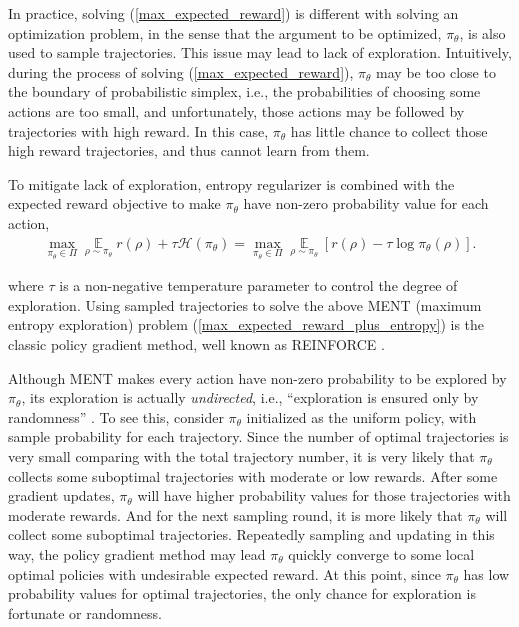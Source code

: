 \documentclass{article}
\DeclareMathOperator*\ep{\mathbb{E}}
\begin{document}
In practice, solving (\ref{max_expected_reward}) is different with solving an optimization problem, in the sense that the argument to be optimized, $\pi_\theta$, is also used to sample trajectories. This issue may lead to lack of exploration. Intuitively, during the process of solving (\ref{max_expected_reward}), $\pi_\theta$ may be too close to the boundary of probabilistic simplex, i.e., the probabilities of choosing some actions are too small, and unfortunately, those actions may be followed by trajectories with high reward. In this case, $\pi_\theta$ has little chance to collect those high reward trajectories, and thus cannot learn from them.

To mitigate lack of exploration, entropy regularizer is combined with the expected reward objective to make $\pi_\theta$ have non-zero probability value for each action,
\begin{equation}
\label{max_expected_reward_plus_entropy}
\begin{split}
	\max\limits_{\pi_\theta \in \Pi}{ \ep\limits_{\rho \sim \pi_\theta}{  r(\rho) } + \tau \mathcal{H}(\pi_\theta) } = 
	\max\limits_{\pi_\theta \in \Pi}{ \ep\limits_{\rho \sim \pi_\theta}{ \left[ r(\rho) - \tau \log{\pi_\theta(\rho)} \right] } }.
\end{split}
\end{equation}

where $\tau$ is a non-negative temperature parameter to control the degree of exploration. Using sampled trajectories to solve the above MENT (maximum entropy exploration) problem (\ref{max_expected_reward_plus_entropy}) is the classic policy gradient method, well known as REINFORCE \cite{williams1992simple,williams1991function}.

Although MENT makes every action have non-zero probability to be explored by $\pi_\theta$, its exploration is actually \textit{undirected}, i.e., ``exploration is ensured only by randomness'' \cite{thrun1992efficient}. To see this, consider $\pi_\theta$ initialized as the uniform policy, with sample probability for each trajectory. Since the number of optimal trajectories is very small comparing with the total trajectory number, it is very likely that $\pi_\theta$ collects some suboptimal trajectories with moderate or low rewards. After some gradient updates, $\pi_\theta$ will have higher probability values for those trajectories with moderate rewards. And for the next sampling round, it is more likely that $\pi_\theta$ will collect some suboptimal trajectories. Repeatedly sampling and updating in this way, the policy gradient method may lead $\pi_\theta$ quickly converge to some local optimal policies with undesirable expected reward. At this point, since $\pi_\theta$ has low probability values for optimal trajectories, the only chance for exploration is fortunate or randomness.
\end{document}

